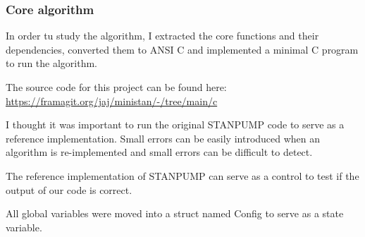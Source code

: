 \documentclass[
  letterpaper,
  DIV=11,
  numbers=noendperiod]{scrartcl}
\begin{document}
\subsubsection{Core algorithm}\label{core-algorithm}

In order tu study the algorithm, I extracted the core functions and
their dependencies, converted them to ANSI C and implemented a minimal C
program to run the algorithm.

The source code for this project can be found here:
\url{https://framagit.org/jaj/ministan/-/tree/main/c}

I thought it was important to run the original STANPUMP code to serve as
a reference implementation. Small errors can be easily introduced when
an algorithm is re-implemented and small errors can be difficult to
detect.

The reference implementation of STANPUMP can serve as a control to test
if the output of our code is correct.

All global variables were moved into a struct named Config to serve as a
state variable.
\end{document}

